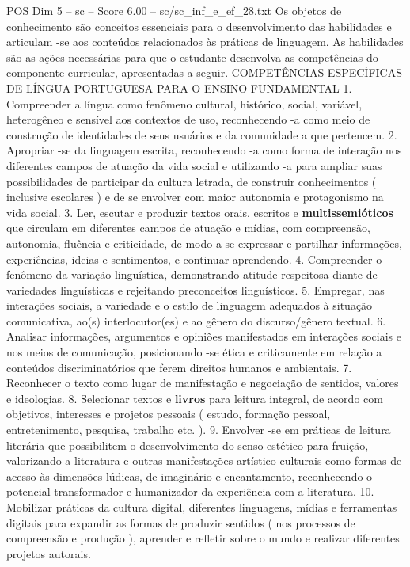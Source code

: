 \begin{textsample}{POS Dim 5 – sc – Score 6.00 – sc/sc\_inf\_e\_ef\_28.txt}
Os objetos de conhecimento são conceitos essenciais para o desenvolvimento das habilidades e articulam -se aos conteúdos relacionados às práticas de linguagem.
As habilidades são as ações necessárias para que o estudante desenvolva as competências do componente curricular, apresentadas a seguir.
COMPETÊNCIAS ESPECÍFICAS DE LÍNGUA PORTUGUESA PARA O ENSINO FUNDAMENTAL 1.
Compreender a língua como fenômeno cultural, histórico, social, variável, heterogêneo e sensível aos contextos de uso, reconhecendo -a como meio de construção de identidades de seus usuários e da comunidade a que pertencem. 2.
Apropriar -se da linguagem escrita, reconhecendo -a como forma de interação nos diferentes campos de atuação da vida social e utilizando -a para ampliar suas possibilidades de participar da cultura letrada, de construir conhecimentos ( inclusive escolares ) e de se envolver com maior autonomia e protagonismo na vida social. 3.
Ler, escutar e produzir textos orais, escritos e \textbf{multissemióticos} que circulam em diferentes campos de atuação e mídias, com compreensão, autonomia, fluência e criticidade, de modo a se expressar e partilhar informações, experiências, ideias e sentimentos, e continuar aprendendo. 4.
Compreender o fenômeno da variação linguística, demonstrando atitude respeitosa diante de variedades linguísticas e rejeitando preconceitos linguísticos. 5.
Empregar, nas interações sociais, a variedade e o estilo de linguagem adequados à situação comunicativa, ao(s) interlocutor(es) e ao gênero do discurso/gênero textual. 6.
Analisar informações, argumentos e opiniões manifestados em interações sociais e nos meios de comunicação, posicionando -se ética e criticamente em relação a conteúdos discriminatórios que ferem direitos humanos e ambientais. 7.
Reconhecer o texto como lugar de manifestação e negociação de sentidos, valores e ideologias. 8.
Selecionar textos e \textbf{livros} para leitura integral, de acordo com objetivos, interesses e projetos pessoais ( estudo, formação pessoal, entretenimento, pesquisa, trabalho etc. ). 9.
Envolver -se em práticas de leitura literária que possibilitem o desenvolvimento do senso estético para fruição, valorizando a literatura e outras manifestações artístico-culturais como formas de acesso às dimensões lúdicas, de imaginário e encantamento, reconhecendo o potencial transformador e humanizador da experiência com a literatura. 10.
Mobilizar práticas da cultura digital, diferentes linguagens, mídias e ferramentas digitais para expandir as formas de produzir sentidos ( nos processos de compreensão e produção ), aprender e refletir sobre o mundo e realizar diferentes projetos autorais.

\end{textsample}
